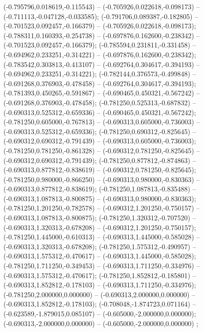 (-0.795796,0.018619,-0.115543) -- (-0.705926,0.022618,-0.098173) -- (-0.711113,-0.047128,-0.033585);
 (-0.791706,0.089387,-0.182805) -- (-0.701523,0.092457,-0.166379) -- (-0.705926,0.022618,-0.098173);
 (-0.788311,0.160393,-0.254738) -- (-0.697876,0.162600,-0.238342) -- (-0.701523,0.092457,-0.166379);
 (-0.785594,0.231811,-0.331458) -- (-0.694962,0.233251,-0.314221) -- (-0.697876,0.162600,-0.238342);
 (-0.783542,0.303813,-0.413107) -- (-0.692764,0.304617,-0.394193) -- (-0.694962,0.233251,-0.314221);
 (-0.782144,0.376573,-0.499848) -- (-0.691268,0.376903,-0.478458) -- (-0.692764,0.304617,-0.394193);
 (-0.781393,0.450265,-0.591867) -- (-0.690465,0.450321,-0.567242) -- (-0.691268,0.376903,-0.478458);
 (-0.781250,0.525313,-0.687832) -- (-0.690313,0.525312,-0.659336) -- (-0.690465,0.450321,-0.567242);
 (-0.781250,0.605000,-0.767813) -- (-0.690313,0.605000,-0.736003) -- (-0.690313,0.525312,-0.659336);
 (-0.781250,0.690312,-0.825645) -- (-0.690312,0.690312,-0.791439) -- (-0.690313,0.605000,-0.736003);
 (-0.781250,0.781250,-0.861328) -- (-0.690312,0.781250,-0.825645) -- (-0.690312,0.690312,-0.791439);
 (-0.781250,0.877812,-0.874863) -- (-0.690313,0.877812,-0.838619) -- (-0.690312,0.781250,-0.825645);
 (-0.781250,0.980000,-0.866250) -- (-0.690313,0.980000,-0.830363) -- (-0.690313,0.877812,-0.838619);
 (-0.781250,1.087813,-0.835488) -- (-0.690313,1.087813,-0.800875) -- (-0.690313,0.980000,-0.830363);
 (-0.781250,1.201250,-0.782578) -- (-0.690312,1.201250,-0.750157) -- (-0.690313,1.087813,-0.800875);
 (-0.781250,1.320312,-0.707520) -- (-0.690313,1.320313,-0.678208) -- (-0.690312,1.201250,-0.750157);
 (-0.781250,1.445000,-0.610313) -- (-0.690313,1.445000,-0.585028) -- (-0.690313,1.320313,-0.678208);
 (-0.781250,1.575312,-0.490957) -- (-0.690313,1.575312,-0.470617) -- (-0.690313,1.445000,-0.585028);
 (-0.781250,1.711250,-0.349453) -- (-0.690313,1.711250,-0.334976) -- (-0.690313,1.575312,-0.470617);
 (-0.781250,1.852812,-0.185801) -- (-0.690313,1.852812,-0.178103) -- (-0.690313,1.711250,-0.334976);
 (-0.781250,2.000000,0.000000) -- (-0.690313,2.000000,0.000000) -- (-0.690313,1.852812,-0.178103);
 (-0.708048,-1.874723,0.071164) -- (-0.623589,-1.879015,0.085107) -- (-0.605000,-2.000000,0.000000);
 (-0.690313,-2.000000,0.000000) -- (-0.605000,-2.000000,0.000000) ;
